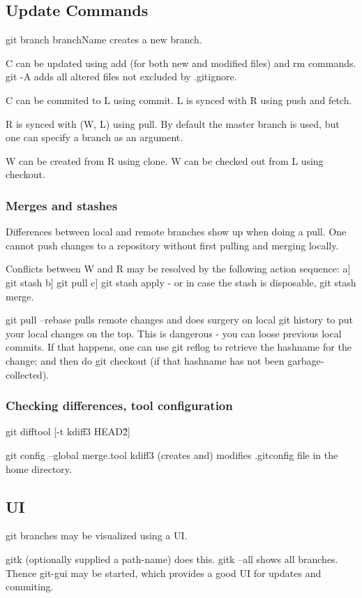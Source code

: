 \documentclass[oneside, article]{memoir}
\begin{document}
\subsection{Update Commands}
git branch branchName creates a new branch.

C can be updated using add (for both new and modified files) and rm commands. git -A adds all altered files not excluded by .gitignore.

C can be commited to L using commit. L is synced with R using push and fetch.

R is synced with (W, L) using pull. By default the master branch is used, but one can specify a branch as an argument. 

W can be created from R using clone. W can be checked out from L using checkout.

\subsubsection{Merges and stashes}
Differences between local and remote branches show up when doing a pull. One cannot push changes to a repository without first pulling and merging locally. 

Conflicts between W and R may be resolved by the following action sequence: a] git stash b] git pull c] git stash apply - or in case the stash is disposable, git stash merge.

git pull --rebase pulls remote changes and does surgery on local git history to put your local changes on the top. This is dangerous - you can loose previous local commits. If that happens, one can use git reflog to retrieve the hashname for the change; and then do git checkout (if that hashname has not been garbage-collected).

\subsubsection{Checking differences, tool configuration}
git difftool [-t kdiff3 HEAD\~2]

git config --global merge.tool kdiff3 (creates and) modifies .gitconfig file in the home directory. 


\subsection{UI}
git branches may be visualized using a UI.

gitk (optionally supplied a path-name) does this. gitk --all shows all branches. Thence git-gui may be started, which provides a good UI for updates and commiting.
\end{document}
